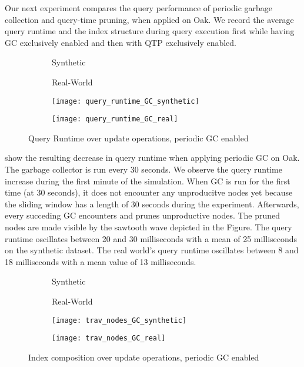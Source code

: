 \documentclass[abstracton,12pt]{scrartcl}
\theoremstyle{definition}
\begin{document}
\label{sec:gc-qtp-performance}

Our next experiment compares the query performance of periodic garbage collection and
query-time pruning, when applied on Oak. We record the average query runtime and
the index structure during query execution first while having GC exclusively enabled and
then with QTP exclusively enabled.

\begin{figure}[h]
  \centering
  \begin{subfigure}{0.49\linewidth}
    \centering Synthetic
  \end{subfigure}
  \begin{subfigure}{0.49\linewidth}
    \centering Real-World
  \end{subfigure}
  \begin{subfigure}{0.49\linewidth}
    \texttt{[image: query\_runtime\_GC\_synthetic]}
    \caption{}
    \label{fig:query_runtime_GC_synthetic}
  \end{subfigure}
  \begin{subfigure}{0.49\linewidth}
    \texttt{[image: query\_runtime\_GC\_real]}
    \caption{}
    \label{fig:query_runtime_GC_real}
  \end{subfigure}
  \caption{Query Runtime over update operations, periodic GC enabled}
\end{figure}

 show the
resulting decrease in query runtime when applying periodic GC on Oak. The
garbage collector is run every 30 seconds. We observe the query runtime
increase during the first minute of the simulation. 
When GC is run for the first time (at 30 seconds), it does not encounter
any unproducitve nodes yet because the sliding window has a length of 30
seconds during the experiment. Afterwards, every succeding GC encounters
and prunes unproductive nodes. The pruned nodes are made visible by the
sawtooth wave depicted in the Figure. The query runtime oscillates between
20 and 30 milliseconds with a mean of 25 milliseconds on the synthetic dataset.
The real world's query runtime oscillates between 8 and 18 milliseconds with a mean
value of 13 milliseconds.

\begin{figure}[h]
  \centering
  \begin{subfigure}{0.49\linewidth}
    \centering Synthetic
  \end{subfigure}
  \begin{subfigure}{0.49\linewidth}
    \centering Real-World
  \end{subfigure}
  \begin{subfigure}{0.49\linewidth}
    \texttt{[image: trav\_nodes\_GC\_synthetic]}
    \caption{}
    \label{fig:trav_nodes_GC_synthetic}
  \end{subfigure}
  \begin{subfigure}{0.49\linewidth}
    \texttt{[image: trav\_nodes\_GC\_real]}
    \caption{}
    \label{fig:trav_nodes_GC_real}
  \end{subfigure}
  \caption{Index composition over update operations, periodic GC enabled}
\end{figure}
\end{document}
